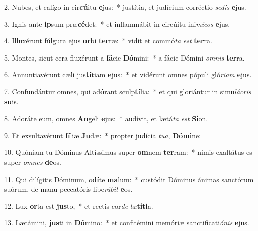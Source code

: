 2. Nubes, et calígo in cir\textbf{cú}itu \textbf{e}jus:~*  justítia, et judícium corréctio \textit{se}\textit{dis} \textbf{e}jus.\

3. Ignis ante \textbf{ip}sum præ\textbf{cé}det:~*  et inflammábit in circúitu ini\textit{mí}\textit{cos} \textbf{e}jus.\

4. Illuxérunt fúlgura ejus \textbf{or}bi \textbf{ter}ræ:~*  vidit et commó\textit{ta} \textit{est} \textbf{ter}ra.\

5. Montes, sicut cera fluxérunt a \textbf{fá}cie \textbf{Dó}mini:~*  a fácie Dómini \textit{om}\textit{nis} \textbf{ter}ra.\

6. Annuntiavérunt cæli jus\textbf{tí}tiam \textbf{e}jus:~*  et vidérunt omnes pópuli gló\textit{ri}\textit{am} \textbf{e}jus.\

7. Confundántur omnes, qui ad\textbf{ó}rant sculp\textbf{tí}lia:~*  et qui gloriántur in simu\textit{lá}\textit{cris} \textbf{su}is.\

8. Adoráte eum, omnes \textbf{An}geli \textbf{e}jus:~*  audívit, et lætá\textit{ta} \textit{est} \textbf{Si}on.\

9. Et exsultavérunt \textbf{fí}liæ \textbf{Ju}dæ:~*  propter judícia \textit{tu}\textit{a}, \textbf{Dó}\textbf{mi}ne:\

10. Quóniam tu Dóminus Altíssimus super \textbf{om}nem \textbf{ter}ram:~*  nimis exaltátus es super \textit{om}\textit{nes} \textbf{de}os.\

11. Qui dilígitis Dóminum, o\textbf{dí}te \textbf{ma}lum:~*  custódit Dóminus ánimas sanctórum suórum, de manu peccatóris libe\textit{rá}\textit{bit} \textbf{e}os.\

12. Lux \textbf{or}ta est \textbf{jus}to,~*  et rectis cor\textit{de} \textit{læ}\textbf{tí}\textbf{ti}a.\

13. Lætámini, \textbf{jus}ti in \textbf{Dó}mino:~*  et confitémini memóriæ sanctificati\textit{ó}\textit{nis} \textbf{e}jus.\

